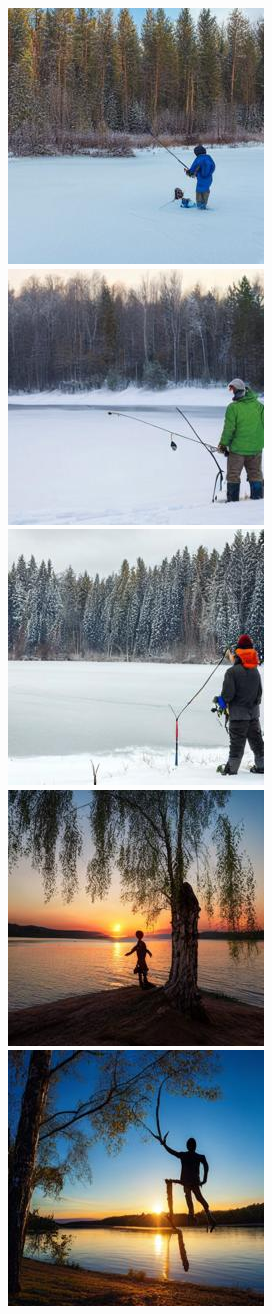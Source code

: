 \begin{figure}[h!]
\begin{subfigure}[t]{0.32\linewidth}
	\includegraphics[width=0.320\linewidth]{figs/samples_appendix_3/adjmat_cfg_2_ode_prompt_65_image_1.jpg}\;%
	\includegraphics[width=0.320\linewidth]{figs/samples_appendix_3/adjmat_cfg_2_ode_prompt_65_image_2.jpg}\;%
	\includegraphics[width=0.320\linewidth]{figs/samples_appendix_3/adjmat_cfg_2_ode_prompt_65_image_3.jpg}\\ 
	\includegraphics[width=0.320\linewidth]{figs/samples_appendix_3/adjmat_cfg_2_ode_prompt_69_image_1.jpg}\;%
	\includegraphics[width=0.320\linewidth]{figs/samples_appendix_3/adjmat_cfg_2_ode_prompt_69_image_2.jpg}\;%

\end{subfigure}
\end{figure}
